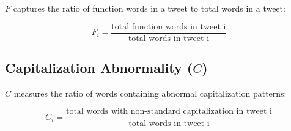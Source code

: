 $ F $ captures the ratio of function words in a tweet to total words in a tweet:

$$ F_i = \frac{\text{total function words in tweet i}}{\text{total words in tweet i}} $$

\subsection*{Capitalization Abnormality ($C$)}
$ C $ measures the ratio of words containing abnormal capitalization patterns:

$$ C_i = \frac{\text{total words with non-standard capitalization in tweet i}}{\text{total words in tweet i}} $$
